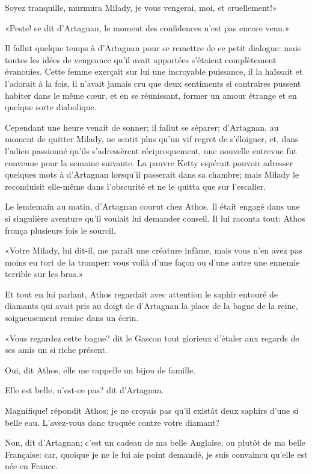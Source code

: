 \speak  Soyez tranquille, murmura Milady, je vous vengerai, moi, et cruellement!» 

«Peste! se dit d'Artagnan, le moment des confidences n'est pas encore venu.» 

Il fallut quelque temps à d'Artagnan pour se remettre de ce petit dialogue: mais toutes les idées de vengeance qu'il avait apportées s'étaient complètement évanouies. Cette femme exerçait sur lui une incroyable puissance, il la haïssait et l'adorait à la fois, il n'avait jamais cru que deux sentiments si contraires pussent habiter dans le même cœur, et en se réunissant, former un amour étrange et en quelque sorte diabolique. 

Cependant une heure venait de sonner; il fallut se séparer; d'Artagnan, au moment de quitter Milady, ne sentit plus qu'un vif regret de s'éloigner, et, dans l'adieu passionné qu'ils s'adressèrent réciproquement, une nouvelle entrevue fut convenue pour la semaine suivante. La pauvre Ketty espérait pouvoir adresser quelques mots à d'Artagnan lorsqu'il passerait dans sa chambre; mais Milady le reconduisit elle-même dans l'obscurité et ne le quitta que sur l'escalier. 

Le lendemain au matin, d'Artagnan courut chez Athos. Il était engagé dans une si singulière aventure qu'il voulait lui demander conseil. Il lui raconta tout: Athos fronça plusieurs fois le sourcil. 

«Votre Milady, lui dit-il, me paraît une créature infâme, mais vous n'en avez pas moins eu tort de la tromper: vous voilà d'une façon ou d'une autre une ennemie terrible sur les bras.» 

Et tout en lui parlant, Athos regardait avec attention le saphir entouré de diamants qui avait pris au doigt de d'Artagnan la place de la bague de la reine, soigneusement remise dans un écrin. 

«Vous regardez cette bague? dit le Gascon tout glorieux d'étaler aux regards de ses amis un si riche présent. 

\speak  Oui, dit Athos, elle me rappelle un bijou de famille. 

\speak  Elle est belle, n'est-ce pas? dit d'Artagnan. 

\speak  Magnifique! répondit Athos; je ne croyais pas qu'il existât deux saphirs d'une si belle eau. L'avez-vous donc troquée contre votre diamant? 

\speak  Non, dit d'Artagnan; c'est un cadeau de ma belle Anglaise, ou plutôt de ma belle Française: car, quoique je ne le lui aie point demandé, je suis convaincu qu'elle est née en France. 

